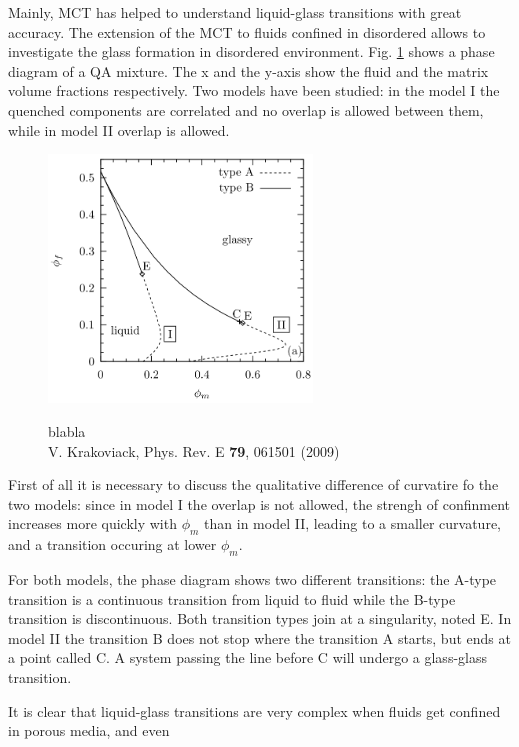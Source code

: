 \documentclass[a4paper,12pt]{article}
\newcommand{\jline}{\vspace{10pt}}
\begin{document}
Mainly, MCT has helped to understand liquid-glass transitions with great accuracy. The extension of the MCT to fluids confined in 
disordered allows to investigate the glass formation in disordered environment. Fig. \ref{lg trans mct} shows a phase diagram
of a QA mixture. The x and the y-axis show the fluid and the matrix volume fractions respectively. Two models have been studied:
in the model I the quenched components are correlated and no overlap is allowed between them, while in model II overlap is 
allowed.

\begin{figure}[htbp]
\centering
\subfigure
{\includegraphics[width=7cm]{pics/lg-trans_mct.png}}
\caption{blabla\\V. Krakoviack, Phys. Rev. E \textbf{79}, 061501 (2009)}
\label{lg trans mct}
\end{figure}

First of all it is necessary to discuss the qualitative difference of curvatire fo the two models: since in model I the overlap is 
not allowed, the strengh of confinment increases more quickly with $\phi_m$ than in model II, leading to a smaller curvature, and 
a transition occuring at lower $\phi_m$.\jline

For both models, the phase diagram shows two different transitions: the A-type transition is a continuous transition 
from liquid to fluid while the B-type transition is discontinuous. Both transition types join at a singularity, noted E. In model
II the transition B does not stop where the transition A starts, but ends at a point called C. A system passing the line before C
will undergo a glass-glass transition.\jline

It is clear that liquid-glass transitions are very complex when fluids get confined in porous media, and even

\newpage


\end{document}
